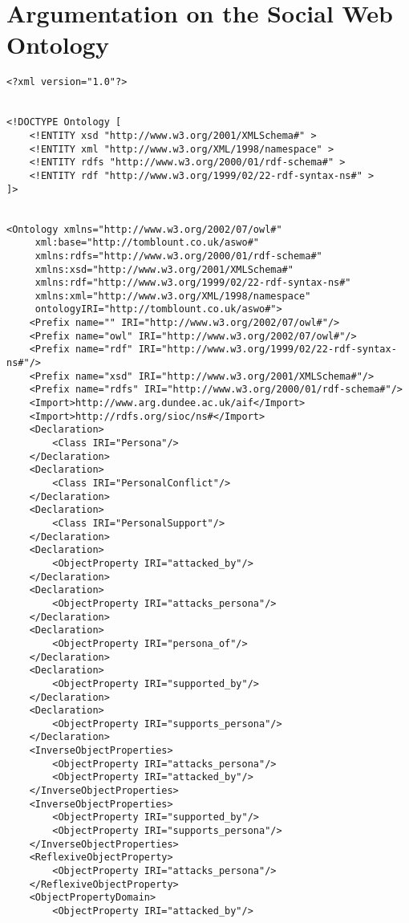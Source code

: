 \chapter{Argumentation on the Social Web Ontology}
\label{appendix:aswo}

\begin{verbatim}
<?xml version="1.0"?>


<!DOCTYPE Ontology [
    <!ENTITY xsd "http://www.w3.org/2001/XMLSchema#" >
    <!ENTITY xml "http://www.w3.org/XML/1998/namespace" >
    <!ENTITY rdfs "http://www.w3.org/2000/01/rdf-schema#" >
    <!ENTITY rdf "http://www.w3.org/1999/02/22-rdf-syntax-ns#" >
]>


<Ontology xmlns="http://www.w3.org/2002/07/owl#"
     xml:base="http://tomblount.co.uk/aswo#"
     xmlns:rdfs="http://www.w3.org/2000/01/rdf-schema#"
     xmlns:xsd="http://www.w3.org/2001/XMLSchema#"
     xmlns:rdf="http://www.w3.org/1999/02/22-rdf-syntax-ns#"
     xmlns:xml="http://www.w3.org/XML/1998/namespace"
     ontologyIRI="http://tomblount.co.uk/aswo#">
    <Prefix name="" IRI="http://www.w3.org/2002/07/owl#"/>
    <Prefix name="owl" IRI="http://www.w3.org/2002/07/owl#"/>
    <Prefix name="rdf" IRI="http://www.w3.org/1999/02/22-rdf-syntax-ns#"/>
    <Prefix name="xsd" IRI="http://www.w3.org/2001/XMLSchema#"/>
    <Prefix name="rdfs" IRI="http://www.w3.org/2000/01/rdf-schema#"/>
    <Import>http://www.arg.dundee.ac.uk/aif</Import>
    <Import>http://rdfs.org/sioc/ns#</Import>
    <Declaration>
        <Class IRI="Persona"/>
    </Declaration>
    <Declaration>
        <Class IRI="PersonalConflict"/>
    </Declaration>
    <Declaration>
        <Class IRI="PersonalSupport"/>
    </Declaration>
    <Declaration>
        <ObjectProperty IRI="attacked_by"/>
    </Declaration>
    <Declaration>
        <ObjectProperty IRI="attacks_persona"/>
    </Declaration>
    <Declaration>
        <ObjectProperty IRI="persona_of"/>
    </Declaration>
    <Declaration>
        <ObjectProperty IRI="supported_by"/>
    </Declaration>
    <Declaration>
        <ObjectProperty IRI="supports_persona"/>
    </Declaration>
    <InverseObjectProperties>
        <ObjectProperty IRI="attacks_persona"/>
        <ObjectProperty IRI="attacked_by"/>
    </InverseObjectProperties>
    <InverseObjectProperties>
        <ObjectProperty IRI="supported_by"/>
        <ObjectProperty IRI="supports_persona"/>
    </InverseObjectProperties>
    <ReflexiveObjectProperty>
        <ObjectProperty IRI="attacks_persona"/>
    </ReflexiveObjectProperty>
    <ObjectPropertyDomain>
        <ObjectProperty IRI="attacked_by"/>

\end{verbatim}
